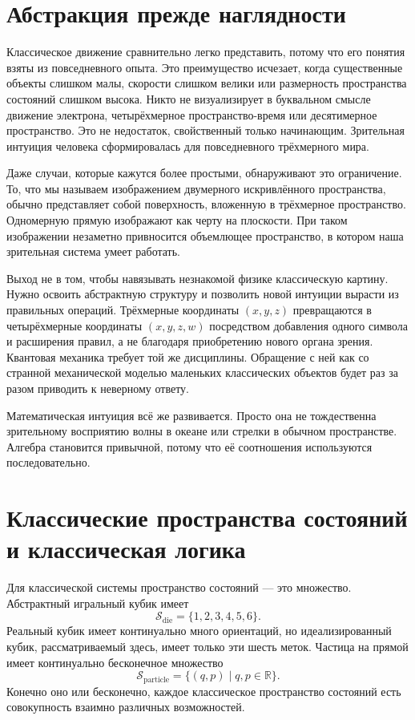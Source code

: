 \section{Абстракция прежде наглядности}

Классическое движение сравнительно легко представить, потому что его понятия взяты из повседневного опыта. Это преимущество исчезает, когда существенные объекты слишком малы, скорости слишком велики или размерность пространства состояний слишком высока. Никто не визуализирует в буквальном смысле движение электрона, четырёхмерное пространство-время или десятимерное пространство. Это не недостаток, свойственный только начинающим. Зрительная интуиция человека сформировалась для повседневного трёхмерного мира.

Даже случаи, которые кажутся более простыми, обнаруживают это ограничение. То, что мы называем изображением двумерного искривлённого пространства, обычно представляет собой поверхность, вложенную в трёхмерное пространство. Одномерную прямую изображают как черту на плоскости. При таком изображении незаметно привносится объемлющее пространство, в котором наша зрительная система умеет работать.

Выход не в том, чтобы навязывать незнакомой физике классическую картину. Нужно освоить абстрактную структуру и позволить новой интуиции вырасти из правильных операций. Трёхмерные координаты \((x,y,z)\) превращаются в четырёхмерные координаты \((x,y,z,w)\) посредством добавления одного символа и расширения правил, а не благодаря приобретению нового органа зрения. Квантовая механика требует той же дисциплины. Обращение с ней как со странной механической моделью маленьких классических объектов будет раз за разом приводить к неверному ответу.

\begin{remark}
Математическая интуиция всё же развивается. Просто она не тождественна зрительному восприятию волны в океане или стрелки в обычном пространстве. Алгебра становится привычной, потому что её соотношения используются последовательно.
\end{remark}

\section{Классические пространства состояний и классическая логика}

Для классической системы пространство состояний — это множество. Абстрактный игральный кубик имеет
\begin{equation}
  \mathcal S_{\mathrm{die}}=\{1,2,3,4,5,6\}.
\end{equation}
Реальный кубик имеет континуально много ориентаций, но идеализированный кубик, рассматриваемый здесь, имеет только эти шесть меток. Частица на прямой имеет континуально бесконечное множество
\begin{equation}
  \mathcal S_{\mathrm{particle}}
  =
  \{(q,p)\mid q,p\in\mathbb R\}.
\end{equation}
Конечно оно или бесконечно, каждое классическое пространство состояний есть совокупность взаимно различных возможностей.

